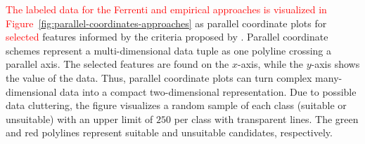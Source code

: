 \documentclass[superscriptaddress,unsortedaddress,
 amsmath,amssymb,
 aps,
]{revtex4-2}
\newcommand{\mrk}[1]{\textcolor{red}{#1}}
\begin{document}
\mrk{The labeled data for the Ferrenti and empirical approaches is visualized in Figure~\ref{fig:parallel-coordinates-approaches}} as parallel coordinate plots for \mrk{selected} features informed by the criteria proposed by \citeauthor{Weber2010} \cite{Weber2010}. Parallel coordinate schemes \cite{Inselberga1990, Inselberg1985} represent a multi-dimensional data tuple as one polyline crossing a parallel axis. The selected features are found on the $x$-axis, while the $y$-axis shows the value of the data. Thus, parallel coordinate plots can turn complex many-dimensional data into a compact  two-dimensional representation. Due to possible data cluttering, the figure visualizes a random sample of each class (suitable or unsuitable) with an upper limit of $250$ per class with transparent lines. The green and red polylines represent suitable and unsuitable candidates, respectively. 
\end{document}
